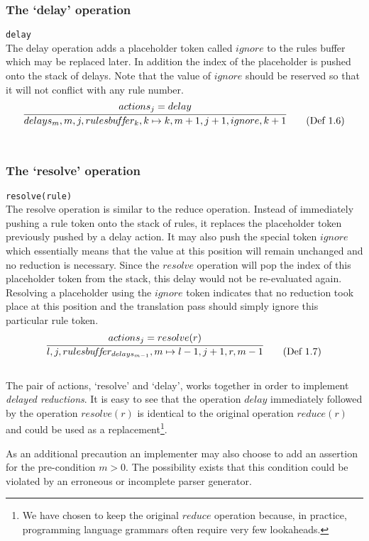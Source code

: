 \documentclass[a4paper,11pt]{article}
\begin{document}
\subsubsection{The `delay' operation}
\texttt{delay}\\
The delay operation adds a placeholder token called $ignore$ to the rules buffer which may be replaced later.
In addition the index of the placeholder is pushed onto the stack of delays.
Note that the value of $ignore$ should be reserved so that it will not conflict with any rule number.
\begin{equation}
\infer{delays_m, m, j, rulesbu\!f\!f\!er_k, k \mapsto k, m+1, j+1, ignore, k+1}{actions_j = delay} \tag{Def 1.6}
\end{equation}\\

\subsubsection{The `resolve' operation}
\texttt{resolve(rule)}\\
The resolve operation is similar to the reduce operation. 
Instead of immediately pushing a rule token onto the stack of rules, it replaces the placeholder token previously pushed by a delay action.
It may also push the special token $ignore$ which essentially means that the value at this position will remain unchanged and no reduction is necessary. 
Since the $resolve$ operation will pop the index of this placeholder token from the stack, this delay would not be re-evaluated again. 
Resolving a placeholder using the $ignore$ token indicates that no reduction took place at this position and the translation pass should simply ignore this particular rule token.
\begin{equation}
\infer{l, j, rulesbu\!f\!f\!er_{delays_{m-1}}, m \mapsto l-1, j+1, r, m-1}{actions_j = resolve(r)} \tag{Def 1.7}
\end{equation}\\

The pair of actions, `resolve' and `delay', works together in order to implement \emph{delayed reductions}. 
It is easy to see that the operation $delay$ immediately followed by the operation $resolve(r)$ is identical to the original operation $reduce(r)$ and could be used as a replacement\footnote{We have chosen to keep the original $reduce$ operation because, in practice, programming language grammars often require very few lookaheads.}.

As an additional precaution an implementer may also choose to add an assertion for the pre-condition $m > 0$. The possibility exists that this condition could be violated by an erroneous or incomplete parser generator.
\end{document}

